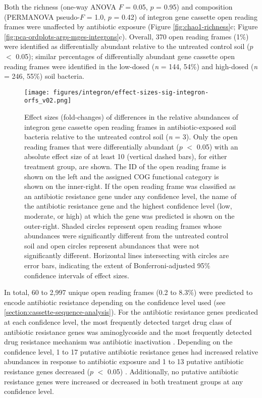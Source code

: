 Both the richness (one-way ANOVA $F$ = 0.05, $p$ = 0.95) and composition (PERMANOVA pseudo-$F$ = 1.0, $p$ = 0.42) of integron gene cassette open reading frames were unaffected by antibiotic exposure (Figure \ref{fig:chao1-richness}c; Figure \ref{fig:pca-ordplots-args-mges-integrons}c).
Overall, 370 open reading frames (1\%) were identified as differentially abundant relative to the untreated control soil ($p$ $<$ 0.05); similar percentages of differentially abundant gene cassette open reading frames were identified in the low-dosed (\textit{n} = 144, 54\%) and high-dosed (\textit{n} = 246, 55\%) soil bacteria.

\begin{figure}[htpb]
	\centering
		\texttt{[image: figures/integron/effect-sizes-sig-integron-orfs\_v02.png]}
	\caption[Effect sizes of differentially abundant integron gene cassette open reading frames.]{
		Effect sizes (fold-changes) of differences in the relative abundances of integron gene cassette open reading frames in antibiotic-exposed soil bacteria relative to the untreated control soil (\textit{n} = 3).
		Only the open reading frames that were differentially abundant ($p$ $<$ 0.05) with an absolute effect size of at least 10 (vertical dashed bars), for either treatment group, are shown.
		The ID of the open reading frame is shown on the left and the assigned COG functional category is shown on the inner-right.
		If the open reading frame was classified as an antibiotic resistance gene under any confidence level, the name of the antibiotic resistance gene and the highest confidence level (low, moderate, or high) at which the gene was predicted is shown on the outer-right.
		Shaded circles represent open reading frames whose abundances were significantly different from the untreated control soil and open circles represent abundances that were not significantly different.
		Horizontal lines intersecting with circles are error bars, indicating the extent of Bonferroni-adjusted 95\% confidence intervals of effect sizes.
	}
	\label{fig:effect-sizes-sig-integron-orfs}
\end{figure}

In total, 60 to 2,997 unique open reading frames (0.2 to 8.3\%) were predicted to encode antibiotic resistance depending on the confidence level used (see \ref{section:cassette-sequence-analysis}).
For the antibiotic resistance genes predicated at each confidence level, the most frequently detected target drug class of antibiotic resistance genes was aminoglycoside \dummysupfig and the most frequently detected drug resistance mechanism was antibiotic inactivation \dummysupfig.
Depending on the confidence level, 1 to 17 putative antibiotic resistance genes had increased relative abundances in response to antibiotic exposure and 1 to 13 putative antibiotic resistance genes decreased ($p$ $<$ 0.05) \dummysuptab.
Additionally, no putative antibiotic resistance genes were increased or decreased in both treatment groups at any confidence level.

